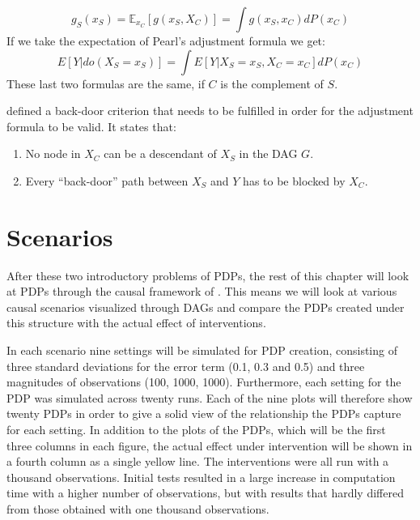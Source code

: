 \documentclass[
]{krantz}
\begin{document}
\[ g_S(x_S) = \mathbb E_{x_C}[g(x_S, X_C)] = \int g(x_S, x_C)dP(x_C)  \]
If we take the expectation of Pearl's adjustment formula we get:
\[ E[Y |do(X_S = x_S)] = \int E[Y |X_S = x_S, X_C = x_C] dP(x_C) \]
These last two formulas are the same, if \(C\) is the complement of \(S\).

\citep{pearl1993} defined a back-door criterion that needs to be fulfilled in order for the adjustment formula to be valid. It states that:

\begin{enumerate}
\def\labelenumi{\arabic{enumi}.}
\item
  No node in \(X_C\) can be a descendant of \(X_S\) in the DAG \(G\).
\item
  Every ``back-door'' path between \(X_S\) and \(Y\) has to be blocked by \(X_C\).
\end{enumerate}

\hypertarget{scenarios}{%
\section{Scenarios}\label{scenarios}}

After these two introductory problems of PDPs, the rest of this chapter will look at PDPs through the causal framework of \citep{pearl1993}. This means we will look at various causal scenarios visualized through DAGs and compare the PDPs created under this structure with the actual effect of interventions.

In each scenario nine settings will be simulated for PDP creation, consisting of three standard deviations for the error term (0.1, 0.3 and 0.5) and three magnitudes of observations (100, 1000, 1000). Furthermore, each setting for the PDP was simulated across twenty runs. Each of the nine plots will therefore show twenty PDPs in order to give a solid view of the relationship the PDPs capture for each setting. In addition to the plots of the PDPs, which will be the first three columns in each figure, the actual effect under intervention will be shown in a fourth column as a single yellow line. The interventions were all run with a thousand observations. Initial tests resulted in a large increase in computation time with a higher number of observations, but with results that hardly differed from those obtained with one thousand observations.
\end{document}
